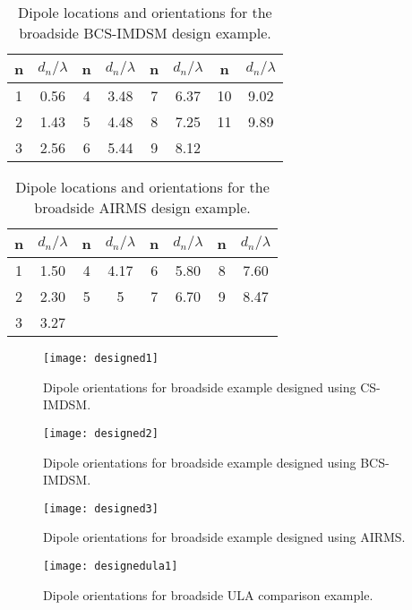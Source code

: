 \documentclass[10pt,final]{IEEEtran}
\begin{document}
\begin{table}
\caption{\rm Dipole locations and orientations for the broadside BCS-IMDSM design example.} \centering
\begin{tabular}{|c|c|c|c|c|c|c|c|}\hline
n  & $d_{n}/\lambda$ &  n & $d_{n}/\lambda$ &  n & $d_{n}/\lambda$ & n & $d_{n}/\lambda$\\
\hline
1  & 0.56   &  4 &   3.48   &  7 &  6.37  & 10 & 9.02 \\
\hline
2  & 1.43 &  5  &  4.48    &  8 &  7.25  & 11 & 9.89 \\
\hline
3  &2.56  &   6  &   5.44  &  9 & 8.12    \\
\cline{1-6}
\end{tabular}
\label{tb:BCSbroad}
\end{table}

\begin{table}
\caption{\rm Dipole locations and orientations for the broadside AIRMS design example.} \centering
\begin{tabular}{|c|c|c|c|c|c|c|c|}\hline
n  & $d_{n}/\lambda$ &  n & $d_{n}/\lambda$ &  n & $d_{n}/\lambda$ & n & $d_{n}/\lambda$\\
\hline
1  & 1.50   &  4 &  4.17    &  6 &  5.80  & 8 & 7.60 \\
\hline
2  & 2.30 &  5  &  5    &  7 &  6.70  & 9 &8.47  \\
\hline
3  &  3.27  \\
\cline{1-2}
\end{tabular}
\label{tb:reweightedbroad}
\end{table}
\begin{figure}
\begin{center}
   \texttt{[image: designed1]}
   \caption{Dipole orientations for broadside example designed using CS-IMDSM.
    \label{fig:designed1}}
\end{center}
\end{figure}
\begin{figure}
\begin{center}
   \texttt{[image: designed2]}
   \caption{Dipole orientations for broadside example designed using BCS-IMDSM.
    \label{fig:designed2}}
\end{center}
\end{figure}
\begin{figure}
\begin{center}
   \texttt{[image: designed3]}
   \caption{Dipole orientations for broadside example designed using AIRMS.
    \label{fig:designed3}}
\end{center}
\end{figure}
\begin{figure}
\begin{center}
   \texttt{[image: designedula1]}
   \caption{Dipole orientations for broadside ULA comparison example.
    \label{fig:designedula1}}
\end{center}
\end{figure}
\end{document}
